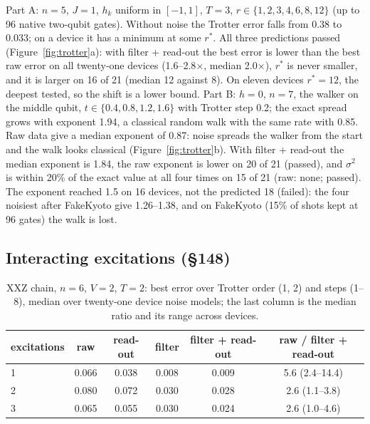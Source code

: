 \documentclass[11pt]{article}
\begin{document}
Part A: $n=5$, $J=1$, $h_k$ uniform in $[-1,1]$, $T=3$, $r\in\{1,2,3,4,6,8,12\}$ (up to 96 native two-qubit
gates). Without noise the Trotter error falls from 0.38 to 0.033; on a device it has a minimum at some $r^*$.
All three predictions passed (Figure~\ref{fig:trotter}a): with filter + read-out the best error is lower than
the best raw error on all twenty-one devices (1.6--2.8$\times$, median 2.0$\times$), $r^*$ is never smaller,
and it is larger on 16 of 21 (median 12 against 8). On eleven devices $r^*=12$, the deepest tested, so the
shift is a lower bound. Part B: $h=0$, $n=7$, the walker on the middle qubit, $t\in\{0.4,0.8,1.2,1.6\}$ with
Trotter step 0.2; the exact spread grows with exponent 1.94, a classical random walk with the same rate with
0.85. Raw data give a median exponent of 0.87: noise spreads the walker from the start and the walk looks
classical (Figure~\ref{fig:trotter}b). With filter + read-out the median exponent is 1.84, the raw exponent is
lower on 20 of 21 (passed), and $\sigma^2$ is within 20\% of the exact value at all four times on 15 of 21
(raw: none; passed). The exponent reached 1.5 on 16 devices, not the predicted 18 (failed): the four noisiest
after FakeKyoto give 1.26--1.38, and on FakeKyoto (15\% of shots kept at 96 gates) the walk is lost.

\subsection{Interacting excitations (§148)}

\begin{table}[h]
\centering\small
\begin{tabular}{lccccc}
\toprule
excitations & raw & read-out & filter & filter + read-out & raw / filter + read-out\\
\midrule
1 & 0.066 & 0.038 & 0.008 & 0.009 & 5.6 (2.4--14.4)\\
2 & 0.080 & 0.072 & 0.030 & 0.028 & 2.6 (1.1--3.8)\\
3 & 0.065 & 0.055 & 0.030 & 0.024 & 2.6 (1.0--4.6)\\
\bottomrule
\end{tabular}
\caption{XXZ chain, $n=6$, $V=2$, $T=2$: best error over Trotter order (1, 2) and steps (1--8), median over
twenty-one device noise models; the last column is the median ratio and its range across devices.}
\label{tab:xxz}
\end{table}
\end{document}

